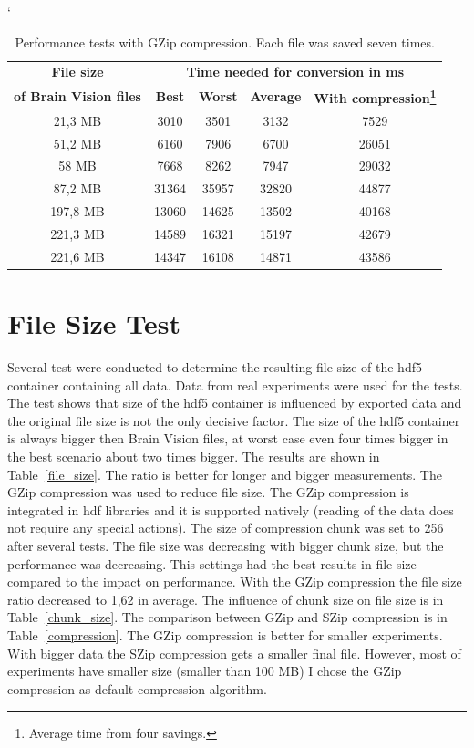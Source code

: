 \begin{table}
	 \catcode`
	\centering
	\caption{Performance tests with GZip compression. Each file was saved seven times.}
	\label{speed_test}
	\begin{tabular}{|c|c|c|c|c|}
		\hline
\textbf{File size} & \multicolumn{4}{c|}{\textbf{Time needed for conversion in ms}}\\ 
	\cline{2-5}		
	\textbf{ of Brain Vision files}	&\textbf{Best} & \textbf{Worst} & \textbf{Average} & \textbf{With compression\footnote{Average time from four savings.}}\\ 
	\hline
				\hline 21,3 MB & 3010 & 3501  & 3132& 7529 \\ 	
			\hline 51,2 MB & 6160  & 7906 & 6700 & 26051\\ 
				\hline 58 MB & 7668 &  8262 &  7947& 29032\\ 
			\hline 87,2 MB & 31364 & 35957 & 32820& 44877\\ 
			\hline 197,8 MB & 13060  & 14625 &  13502& 40168\\ 		
			\hline 221,3 MB & 14589 & 16321 & 15197& 42679 \\ 
			\hline 221,6 MB & 14347  & 16108 & 14871& 43586\\ 
		\hline 
	\end{tabular} 
\end{table}

\section{File Size Test}
Several test were conducted to determine the resulting file size of the \gls{hdf5} container containing all data. Data from real experiments were used for the tests. The test shows that size of the \gls{hdf5} container is influenced by exported data and the original file size is not the only decisive factor. The size of the \gls{hdf5} container is always bigger then Brain Vision files, at worst case even four times bigger in the best scenario about two times bigger. The results are shown in Table~\ref{file_size}. The ratio is better for longer and bigger measurements. The GZip compression was used to reduce file size. The GZip compression is integrated in \gls{hdf} libraries and it is supported natively (reading of the data does not require any special actions). The size of compression chunk was set to 256 after several tests. The file size was decreasing with bigger chunk size, but the performance was decreasing. This settings had the best results in file size compared to the impact on performance. With the GZip compression the file size ratio decreased to 1,62 in average. The influence of chunk size on file size is in Table~\ref{chunk_size}. The comparison between GZip and SZip compression is in Table~\ref{compression}. The GZip compression is better for smaller experiments. With bigger data the SZip compression gets a smaller final file. However, most of experiments have smaller size (smaller than 100 MB) I chose the GZip compression as default compression algorithm.

